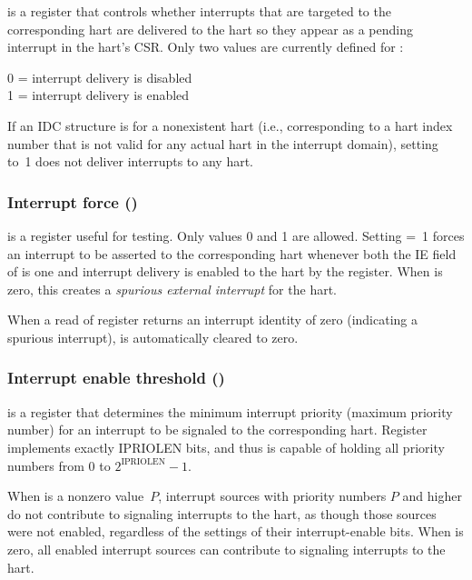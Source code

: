  is a {\WARL} register that controls whether interrupts
that are targeted to the corresponding hart are delivered to the hart
so they appear as a pending interrupt in the hart's  CSR.
Only two values are currently defined for :
\begin{displayLinesTable}
0 = interrupt delivery is disabled \\
1 = interrupt delivery is enabled \\
\end{displayLinesTable}

If an IDC structure is for a nonexistent hart (i.e., corresponding
to a hart index number that is not valid for any actual hart in
the interrupt domain), setting  to~1 does not deliver
interrupts to any hart.

\subsubsection{Interrupt force ()}

 is a {\WARL} register useful for testing.
Only values 0 and 1 are allowed.
Setting  =~1 forces an interrupt to be asserted to the
corresponding hart whenever both the IE field of  is one
and interrupt delivery is enabled to the hart by the 
register.
When  is zero, this creates a \emph{spurious external
interrupt} for the hart.

When a read of register  returns an interrupt identity of
zero (indicating a spurious interrupt),  is automatically
cleared to zero.

\subsubsection{Interrupt enable threshold ()}

 is a {\WLRL} register that determines the minimum
interrupt priority (maximum priority number) for an interrupt to be
signaled to the corresponding hart.
Register  implements exactly IPRIOLEN bits,
and thus is capable of holding all priority numbers from 0 to
${\mbox{2}^{\textrm{IPRIOLEN}} - \mbox{1}}$.

When  is a nonzero value~$P$, interrupt sources with
priority numbers $P$ and higher do not contribute to signaling
interrupts to the hart, as though those sources were not enabled,
regardless of the settings of their interrupt-enable bits.
When  is zero, all enabled interrupt sources can
contribute to signaling interrupts to the hart.

